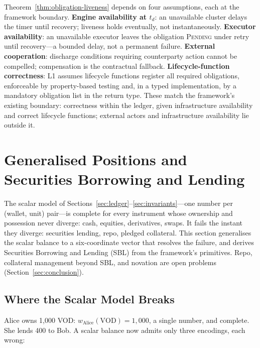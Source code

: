 \documentclass[11pt,a4paper]{article}
\begin{document}
Theorem~\ref{thm:obligation-liveness} depends on four assumptions, each at the framework boundary. \textbf{Engine availability at $t_d$}: an unavailable cluster delays the timer until recovery; liveness holds eventually, not instantaneously. \textbf{Executor availability}: an unavailable executor leaves the obligation \textsc{Pending} under retry until recovery---a bounded delay, not a permanent failure. \textbf{External cooperation}: discharge conditions requiring counterparty action cannot be compelled; compensation is the contractual fallback. \textbf{Lifecycle-function correctness}: L1 assumes lifecycle functions register all required obligations, enforceable by property-based testing and, in a typed implementation, by a mandatory obligation list in the return type. These match the framework's existing boundary: correctness within the ledger, given infrastructure availability and correct lifecycle functions; external actors and infrastructure availability lie outside it.

\section{Generalised Positions and Securities Borrowing and Lending}
\label{sec:gpm}

The scalar model of Sections~\ref{sec:ledger}--\ref{sec:invariants}---one number per (wallet, unit) pair---is complete for every instrument whose ownership and possession never diverge: cash, equities, derivatives, swaps. It fails the instant they diverge: securities lending, repo, pledged collateral. This section generalises the scalar balance to a six-coordinate vector that resolves the failure, and derives Securities Borrowing and Lending (SBL) from the framework's primitives. Repo, collateral management beyond SBL, and novation are open problems (Section~\ref{sec:conclusion}).

\subsection{Where the Scalar Model Breaks}
\label{sec:scalar-breaks}

Alice owns 1{,}000 VOD: $w_{\mathrm{Alice}}(\text{VOD}) = 1{,}000$, a single number, and complete. She lends 400 to Bob. A scalar balance now admits only three encodings, each wrong:
\end{document}
